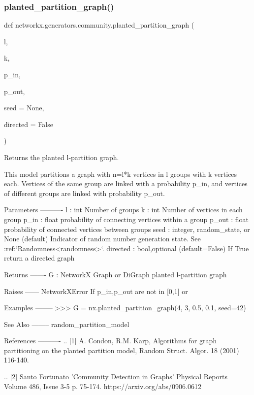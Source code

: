 \subsubsection{\texorpdfstring{planted\+\_\+partition\+\_\+graph()}{planted\_partition\_graph()}}
{\footnotesize\ttfamily def networkx.\+generators.\+community.\+planted\+\_\+partition\+\_\+graph (\begin{DoxyParamCaption}\item[{}]{l,  }\item[{}]{k,  }\item[{}]{p\+\_\+in,  }\item[{}]{p\+\_\+out,  }\item[{}]{seed = {\ttfamily None},  }\item[{}]{directed = {\ttfamily False} }\end{DoxyParamCaption})}

\begin{DoxyVerb}Returns the planted l-partition graph.

This model partitions a graph with n=l*k vertices in
l groups with k vertices each. Vertices of the same
group are linked with a probability p_in, and vertices
of different groups are linked with probability p_out.

Parameters
----------
l : int
  Number of groups
k : int
  Number of vertices in each group
p_in : float
  probability of connecting vertices within a group
p_out : float
  probability of connected vertices between groups
seed : integer, random_state, or None (default)
    Indicator of random number generation state.
    See :ref:`Randomness<randomness>`.
directed : bool,optional (default=False)
  If True return a directed graph

Returns
-------
G : NetworkX Graph or DiGraph
  planted l-partition graph

Raises
------
NetworkXError
  If p_in,p_out are not in [0,1] or

Examples
--------
>>> G = nx.planted_partition_graph(4, 3, 0.5, 0.1, seed=42)

See Also
--------
random_partition_model

References
----------
.. [1] A. Condon, R.M. Karp, Algorithms for graph partitioning
    on the planted partition model,
    Random Struct. Algor. 18 (2001) 116-140.

.. [2] Santo Fortunato 'Community Detection in Graphs' Physical Reports
   Volume 486, Issue 3-5 p. 75-174. https://arxiv.org/abs/0906.0612
\end{DoxyVerb}
 \mbox{\label{namespacenetworkx_1_1generators_1_1community_a05c6dd9281e81b11a8fa71040950b420}} 
